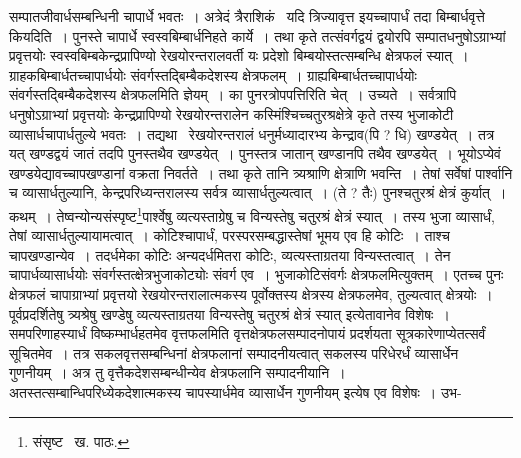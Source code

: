\documentclass[11pt, openany]{book}
\begin{document}
\noindent सम्पातजीवार्धसम्बन्धिनी चापार्धे भवतः~। अत्रेदं त्रैराशिकं \textendash\ यदि त्रिज्यावृत्त इयच्चापार्धं तदा बिम्बार्धवृत्ते कियदिति~। पुनस्ते चापार्धे स्वस्वबिम्बार्धनिहते कार्ये~। तथा कृते तत्संवर्गद्वयं द्वयोरपि सम्पातधनुषोऽग्राभ्यां प्रवृत्तयोः स्वस्वबिम्बकेन्द्रप्रापिण्यो रेखयोरन्तरालवर्ती यः प्रदेशो बिम्बयोस्तत्सम्बन्धि क्षेत्रफलं स्यात्~। ग्राहकबिम्बार्धतच्चापार्धयोः संवर्गस्तद्बिम्बैकदेशस्य क्षेत्रफलम्~। ग्राह्यबिम्बार्धतच्चापार्धयोः संवर्गस्तद्बिम्बैकदेशस्य क्षेत्रफलमिति ज्ञेयम्~। का पुनरत्रोपपत्तिरिति चेत्~। उच्यते~। सर्वत्रापि धनुषोऽग्राभ्यां प्रवृत्तयोः केन्द्रप्रापिण्यो रेखयोरन्तरालेन कस्मिंश्चिच्चतुरश्रक्षेत्रे कृते तस्य भुजाकोटी व्यासार्धचापार्धतुल्ये भवतः~। तद्यथा \textendash\ रेखयोरन्तरालं
धनुर्मध्यादारभ्य केन्द्राव(पि ? धि) खण्डयेत्~। तत्र यत् खण्डद्वयं जातं तदपि पुनस्तथैव खण्डयेत्~। पुनस्तत्र जातान् खण्डानपि तथैव खण्डयेत्~। भूयोऽप्येवं खण्डयेद्यावच्चापखण्डानां वक्रता निवर्तते~। तथा कृते तानि त्र्यश्राणि क्षेत्राणि भवन्ति~। तेषां सर्वेषां पार्श्वानि च
व्यासार्धतुल्यानि, केन्द्रपरिध्यन्तरालस्य सर्वत्र व्यासार्धतुल्यत्वात्~। (ते ? तैः) पुनश्चतुरश्रं क्षेत्रं कुर्यात्~। कथम्~। तेष्वन्योन्यसंस्पृष्ट\renewcommand{\thefootnote}{१}\footnote{संसृष्ट \textendash\ ख. पाठः.}पार्श्वेषु व्यत्यस्ताग्रेषु च विन्यस्तेषु चतुरश्रं क्षेत्रं स्यात्~। तस्य भुजा व्यासार्धं, तेषां व्यासार्धतुल्यायामत्वात्~। कोटिश्चापार्धं, परस्परसम्बद्धास्तेषां भूमय एव हि कोटिः~। ताश्च चापखण्डान्येव~। तदर्धमेका कोटिः अन्यदर्धमितरा कोटिः, व्यत्यस्ताग्रतया विन्यस्तत्वात्~। तेन चापार्धव्यासार्धयोः संवर्गस्तत्क्षेत्रभुजाकोट्योः संवर्ग एव~। भुजाकोटिसंवर्गः क्षेत्रफलमित्युक्तम्~। एतच्च पुनः क्षेत्रफलं चापाग्राभ्यां प्रवृत्तयो रेखयोरन्तरालात्मकस्य पूर्वोक्तस्य क्षेत्रस्य क्षेत्रफलमेव, तुल्यत्वात् क्षेत्रयोः~। पूर्वप्रदर्शितेषु त्र्यश्रेषु खण्डेषु व्यत्यस्ताग्रतया विन्यस्तेषु चतुरश्रं क्षेत्रं स्यात् इत्येतावानेव विशेषः~। {\qt समपरिणाहस्यार्धं विष्कम्भार्धहतमेव वृत्तफलमि}ति वृत्तक्षेत्रफलसम्पादनोपायं प्रदर्शयता सूत्रकारेणाप्येतत्सर्वं सूचितमेव~। तत्र सकलवृत्तसम्बन्धिनां क्षेत्रफलानां सम्पादनीयत्वात् सकलस्य परिधेरर्धं व्यासार्धेन गुणनीयम्~। अत्र तु वृत्तैकदेशसम्बन्धीन्येव क्षेत्रफलानि सम्पादनीयानि~। अतस्तत्सम्बान्धिपरिध्येकदेशात्मकस्य चापस्यार्धमेव व्यासार्धेन गुणनीयम् इत्येष एव विशेषः~। उभ-

\newpage
\end{document}
